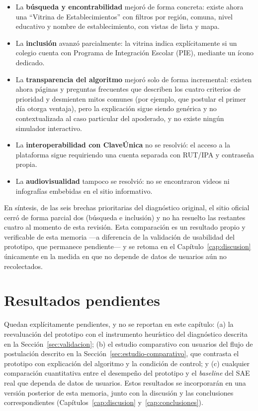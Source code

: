 \begin{itemize}
    \item La \textbf{búsqueda y encontrabilidad} mejoró de forma concreta: existe ahora una ``Vitrina de Establecimientos'' con filtros por región, comuna, nivel educativo y nombre de establecimiento, con vistas de lista y mapa.
    \item La \textbf{inclusión} avanzó parcialmente: la vitrina indica explícitamente si un colegio cuenta con Programa de Integración Escolar (PIE), mediante un ícono dedicado.
    \item La \textbf{transparencia del algoritmo} mejoró solo de forma incremental: existen ahora páginas y preguntas frecuentes que describen los cuatro criterios de prioridad y desmienten mitos comunes (por ejemplo, que postular el primer día otorga ventaja), pero la explicación sigue siendo genérica y no contextualizada al caso particular del apoderado, y no existe ningún simulador interactivo.
    \item La \textbf{interoperabilidad con ClaveÚnica} no se resolvió: el acceso a la plataforma sigue requiriendo una cuenta separada con RUT/IPA y contraseña propia.
    \item La \textbf{audiovisualidad} tampoco se resolvió: no se encontraron videos ni infografías embebidas en el sitio informativo.
\end{itemize}

En síntesis, de las seis brechas prioritarias del diagnóstico original, el sitio oficial cerró de forma parcial dos (búsqueda e inclusión) y no ha resuelto las restantes cuatro al momento de esta revisión. Esta comparación es un resultado propio y verificable de esta memoria —a diferencia de la validación de usabilidad del prototipo, que permanece pendiente— y se retoma en el Capítulo~\ref{cap:discusion} únicamente en la medida en que no depende de datos de usuarios aún no recolectados.

\section{Resultados pendientes}\label{sec:res-pendientes}

Quedan explícitamente pendientes, y no se reportan en este capítulo: (a) la reevaluación del prototipo con el instrumento heurístico del diagnóstico descrita en la Sección~\ref{sec:validacion}; (b) el estudio comparativo con usuarios del flujo de postulación descrito en la Sección~\ref{sec:estudio-comparativo}, que contrasta el prototipo con explicación del algoritmo y la condición de control; y (c) cualquier comparación cuantitativa entre el desempeño del prototipo y el \emph{baseline} del SAE real que dependa de datos de usuarios. Estos resultados se incorporarán en una versión posterior de esta memoria, junto con la discusión y las conclusiones correspondientes (Capítulos~\ref{cap:discusion} y~\ref{cap:conclusiones}).
